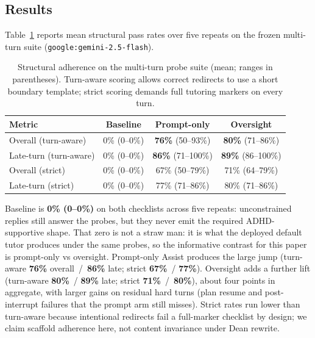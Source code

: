 \subsection{Results}
\label{sec:study1results}

Table~\ref{tab:freeze} reports mean structural pass rates over five repeats on
the frozen multi-turn suite (\texttt{google:gemini-2.5-flash}).

\begin{table}[t]
\caption{Structural adherence on the multi-turn probe suite (mean; ranges in
parentheses). Turn-aware scoring allows correct redirects to use a short
boundary template; strict scoring demands full tutoring markers on every
turn.}
\label{tab:freeze}
\footnotesize
\centering
\setlength{\tabcolsep}{4pt}
\begin{tabular}{lccc}
\toprule
Metric & Baseline & Prompt-only & Oversight \\
\midrule
Overall (turn-aware)
  & 0\% (0--0\%)
  & \textbf{76\%} (50--93\%)
  & \textbf{80\%} (71--86\%) \\
Late-turn (turn-aware)
  & 0\% (0--0\%)
  & \textbf{86\%} (71--100\%)
  & \textbf{89\%} (86--100\%) \\
Overall (strict)
  & 0\% (0--0\%)
  & 67\% (50--79\%)
  & 71\% (64--79\%) \\
Late-turn (strict)
  & 0\% (0--0\%)
  & 77\% (71--86\%)
  & 80\% (71--86\%) \\
\bottomrule
\end{tabular}
\end{table}

Baseline is \textbf{0\% (0--0\%)} on both checklists across five repeats:
unconstrained replies still answer the probes, but they never emit the
required ADHD-supportive shape. That zero is not a straw man: it is what the
deployed default tutor produces under the same probes, so the informative
contrast for this paper is prompt-only vs oversight. Prompt-only Assist
produces the large jump
(turn-aware \textbf{76\%} overall~/~\textbf{86\%} late; strict \textbf{67\%}~/
\textbf{77\%}). Oversight adds a further lift (turn-aware \textbf{80\%}~/
\textbf{89\%} late; strict \textbf{71\%}~/~\textbf{80\%}), about four points
in aggregate, with larger gains on residual hard turns (plan resume and
post-interrupt failures that the prompt arm still misses). Strict
rates run lower than turn-aware because intentional redirects fail a
full-marker checklist by design; we claim scaffold adherence here, not content
invariance under Dean rewrite.
